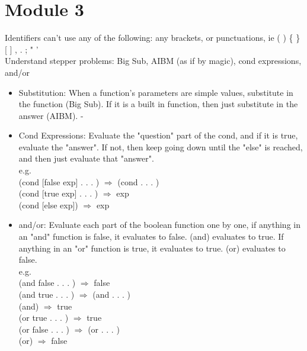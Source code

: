 \documentclass[12pt,letter]{article}
\begin{document}
\section*{Module 3}
Identifiers can't use any of the following: any brackets, or punctuations, ie ( ) \{ \} [ ] , . ; " '\\ 
Understand stepper problems: Big Sub, AIBM (as if by magic), cond expressions, and/or
\begin{itemize}
    \item Substitution: When a function's parameters are simple values, substitute in the function (Big Sub). If it is a built in function, then just substitute in the answer (AIBM). -
    \item Cond Expressions: Evaluate the "question" part of the cond, and if it is true, evaluate the "answer". If not, then keep going down until the "else" is reached, and then just evaluate that "answer". \\ e.g. \\
(cond [false exp] . . . ) $\Rightarrow$ (cond . . . )\\
(cond [true exp] . . . ) $\Rightarrow$ exp\\
(cond [else exp]) $\Rightarrow$ exp
    \item and/or: Evaluate each part of the boolean function one by one, if anything in an "and" function is false, it evaluates to false. (and) evaluates to true. If anything in an "or" function is true, it evaluates to true. (or) evaluates to false. \\ e.g. \\ 
(and false . . . ) $\Rightarrow$ false\\
(and true . . . ) $\Rightarrow$ (and . . . )\\
(and) $\Rightarrow$ true\\
(or true . . . ) $\Rightarrow$ true\\
(or false . . . ) $\Rightarrow$ (or . . . )\\
(or) $\Rightarrow$ false
\end{itemize}
\end{document}
